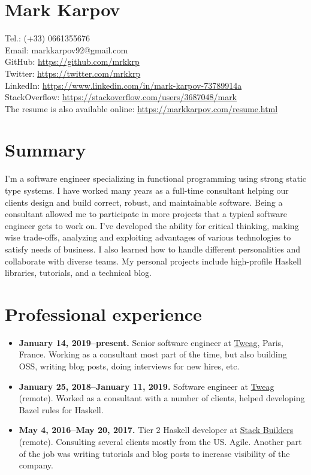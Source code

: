 \documentclass[a4paper,12pt]{article}
\begin{document}
\section*{Mark Karpov}

Tel.: (+33) 0661355676\\
Email: markkarpov92@gmail.com\\
GitHub: \href{https://github.com/mrkkrp}{https://github.com/mrkkrp}\\
Twitter: \href{https://twitter.com/mrkkrp}{https://twitter.com/mrkkrp}\\
LinkedIn: \href{https://www.linkedin.com/in/mark-karpov-73789914a}{https://www.linkedin.com/in/mark-karpov-73789914a}\\
StackOverflow: \href{https://stackoverflow.com/users/3687048/mark}{https://stackoverflow.com/users/3687048/mark}\\
The resume is also available online: \href{https://markkarpov.com/resume.html}{https://markkarpov.com/resume.html}

\sectionfont{\fontsize{12}{15}\selectfont\sectionrule{0pt}{0pt}{-5pt}{0.8pt}}

\section*{Summary}

I'm a software engineer specializing in functional programming using strong
static type systems. I have worked many years as a full-time consultant
helping our clients design and build correct, robust, and maintainable
software. Being a consultant allowed me to participate in more projects that
a typical software engineer gets to work on. I've developed the ability for
critical thinking, making wise trade-offs, analyzing and exploiting
advantages of various technologies to satisfy needs of business. I also
learned how to handle different personalities and collaborate with diverse
teams. My personal projects include high-profile Haskell libraries,
tutorials, and a technical blog.

\section*{Professional experience}

\begin{itemize}[noitemsep]
\item \textbf{January 14, 2019--present.} Senior software engineer at
  \href{https://tweag.io}{Tweag}, Paris, France. Working as a consultant
  most part of the time, but also building OSS, writing blog posts, doing
  interviews for new hires, etc.
\item \textbf{January 25, 2018--January 11, 2019.} Software engineer at
  \href{https://tweag.io}{Tweag} (remote). Worked as a consultant with a
  number of clients, helped developing Bazel rules for Haskell.
\item \textbf{May 4, 2016--May 20, 2017.} Tier 2 Haskell developer at
  \href{https://www.stackbuilders.com/}{Stack Builders} (remote). Consulting
  several clients mostly from the US. Agile. Another part of the job was
  writing tutorials and blog posts to increase visibility of the company.
\end{itemize}
\end{document}
